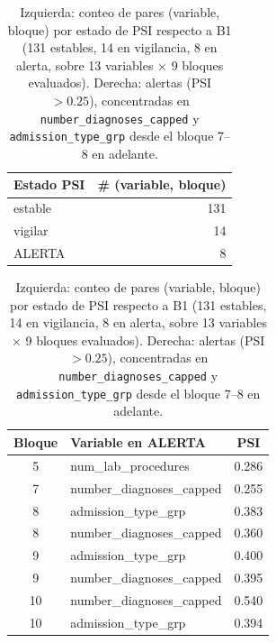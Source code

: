 \begin{table}[H]
\centering\small
\begin{minipage}{0.42\textwidth}
\centering
\begin{tabular}{lr}
\toprule
Estado PSI & \# (variable, bloque) \\
\midrule
estable & 131 \\
vigilar & 14 \\
ALERTA & 8 \\
\bottomrule
\end{tabular}
\end{minipage}%
\begin{minipage}{0.55\textwidth}
\centering
\begin{tabular}{clc}
\toprule
Bloque & Variable en ALERTA & PSI \\
\midrule
5 & num\_lab\_procedures & 0.286 \\
7 & number\_diagnoses\_capped & 0.255 \\
8 & admission\_type\_grp & 0.383 \\
8 & number\_diagnoses\_capped & 0.360 \\
9 & admission\_type\_grp & 0.400 \\
9 & number\_diagnoses\_capped & 0.395 \\
10 & number\_diagnoses\_capped & 0.540 \\
10 & admission\_type\_grp & 0.394 \\
\bottomrule
\end{tabular}
\end{minipage}
\caption{Izquierda: conteo de pares (variable, bloque) por estado de PSI respecto a B1 (131 estables, 14 en vigilancia, 8 en alerta, sobre 13 variables $\times$ 9 bloques evaluados). Derecha: alertas (PSI $>0.25$), concentradas en \texttt{number\_diagnoses\_capped} y \texttt{admission\_type\_grp} desde el bloque 7--8 en adelante.}
\label{tab:drift-resumen}
\end{table}
